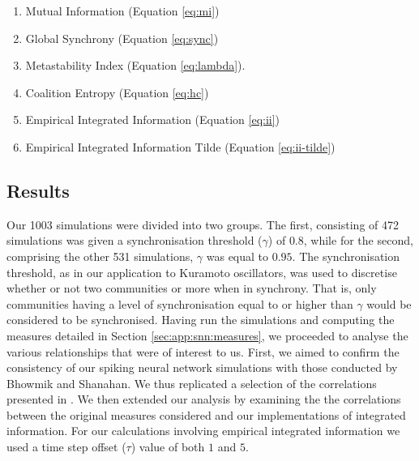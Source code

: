 \documentclass[a4paper,11pt]{article}
\begin{document}
\begin{enumerate}
\item{Mutual Information (Equation \ref{eq:mi})}
\item{Global Synchrony (Equation \ref{eq:sync})}
\item{Metastability Index (Equation \ref{eq:lambda})}.
\item{Coalition Entropy (Equation \ref{eq:hc})}
\item{Empirical Integrated Information (Equation \ref{eq:ii})}
\item{Empirical Integrated Information Tilde (Equation \ref{eq:ii-tilde})}
\end{enumerate}

\subsection{Results}
\label{sec:snn:res}

Our 1003 simulations were divided into two groups. The first, consisting of 472 simulations was given a synchronisation threshold ($\gamma$) of $0.8$, while for the second, comprising the other 531 simulations, $\gamma$ was equal to $0.95$. The synchronisation threshold, as in our application to Kuramoto oscillators, was used to discretise whether or not two communities or more when in synchrony. That is, only communities having a level of synchronisation equal to or higher than $\gamma$ would be considered to be synchronised. Having run the simulations and computing the measures detailed in Section \ref{sec:app:snn:measures}, we proceeded to analyse the various relationships that were of interest to us. First, we aimed to confirm the consistency of our spiking neural network simulations with those conducted by Bhowmik and Shanahan. We thus replicated a selection of the correlations presented in \cite{Bhowmik2013}. We then extended our analysis by examining the the correlations between the original measures considered and our implementations of integrated information. For our calculations involving empirical integrated information we used a time step offset ($\tau$) value of both $1$ and $5$.
\end{document}
